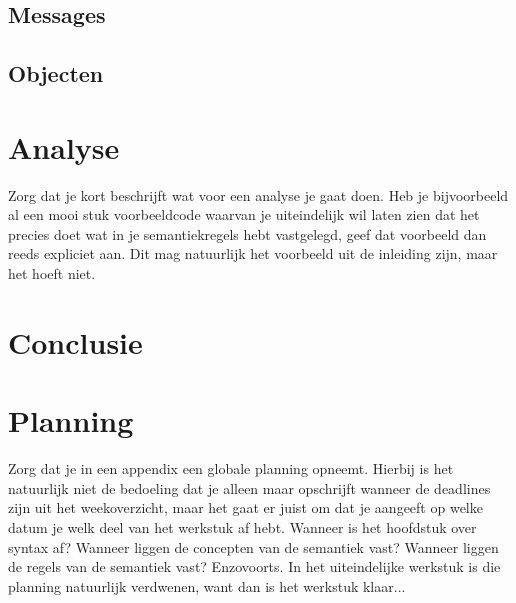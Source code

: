 \documentclass[12pt]{article}
\begin{document}
\subsection{Messages}
\subsection{Objecten}

\section{Analyse}
Zorg dat je kort beschrijft wat voor een analyse je gaat doen. Heb je bijvoorbeeld al een mooi stuk voorbeeldcode waarvan je uiteindelijk wil laten zien dat het precies doet wat in je semantiekregels hebt vastgelegd, geef dat voorbeeld dan reeds expliciet aan. Dit mag natuurlijk het voorbeeld uit de inleiding zijn, maar het hoeft niet.

\section{Conclusie}

\appendix
\section{Planning}
Zorg dat je in een appendix een globale planning opneemt. Hierbij is het natuurlijk niet de bedoeling dat je alleen maar opschrijft wanneer de deadlines zijn uit het weekoverzicht, maar het gaat er juist om dat je aangeeft op welke datum je welk deel van het werkstuk af hebt. Wanneer is het hoofdstuk over syntax af? Wanneer liggen de concepten van de semantiek vast? Wanneer liggen de regels van de semantiek vast? Enzovoorts. In het uiteindelijke werkstuk is die planning natuurlijk verdwenen, want dan is het werkstuk klaar...
\end{document}
